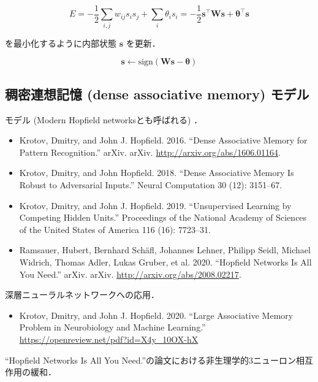 \begin{equation}
E=-{\frac 12}\sum _{{i,j}}{w_{{ij}}{s_{i}}{s_{j}}}+\sum _{i}{\theta _{i}}{s_{i}}=-{\frac 12}\mathbf{s}^\top\mathbf{W}\mathbf{s}+\mathbf{\theta}^\top\mathbf{s}
\end{equation}


を最小化するように内部状態 $\mathbf{s}$ を更新．


\begin{equation}
\mathbf{s}\leftarrow \text{sign}\left(\mathbf{W}\mathbf{s}-\mathbf{\theta}\right)
\end{equation}




\subsection{稠密連想記憶 (dense associative memory) モデル}
\textbf{} モデル (Modern Hopfield networksとも呼ばれる) ．

\begin{itemize}
\item Krotov, Dmitry, and John J. Hopfield. 2016. “Dense Associative Memory for Pattern Recognition.” arXiv. arXiv. \url{http://arxiv.org/abs/1606.01164}.
\item Krotov, Dmitry, and John Hopfield. 2018. “Dense Associative Memory Is Robust to Adversarial Inputs.” Neural Computation 30 (12): 3151–67.
\item Krotov, Dmitry, and John J. Hopfield. 2019. “Unsupervised Learning by Competing Hidden Units.” Proceedings of the National Academy of Sciences of the United States of America 116 (16): 7723–31.
\end{itemize}


\begin{itemize}
\item Ramsauer, Hubert, Bernhard Schäfl, Johannes Lehner, Philipp Seidl, Michael Widrich, Thomas Adler, Lukas Gruber, et al. 2020. “Hopfield Networks Is All You Need.” arXiv. arXiv. \url{http://arxiv.org/abs/2008.02217}.
\end{itemize}

深層ニューラルネットワークへの応用．


\begin{itemize}
\item Krotov, Dmitry, and John J. Hopfield. 2020. “Large Associative Memory Problem in Neurobiology and Machine Learning.” \url{https://openreview.net/pdf?id=X4y_10OX-hX}
\end{itemize}

“Hopfield Networks Is All You Need.”の論文における非生理学的3ニューロン相互作用の緩和．
